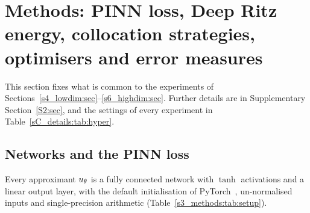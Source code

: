 \section[Methods]{Methods: PINN loss, Deep Ritz energy, collocation strategies, optimisers
and error measures}
\label{s3_methods:sec}

This section fixes what is common to the experiments of
Sections~\ref{s4_lowdim:sec}--\ref{s6_highdim:sec}. Further details are in Supplementary
Section~\ref{S2:sec}, and the settings of every experiment in
Table~\ref{sC_details:tab:hyper}.

\subsection{Networks and the PINN loss}\label{s3_methods:sec:pinn}

Every approximant $u_{\theta}$ is a fully connected network with $\tanh$ activations and a
linear output layer, with the default initialisation of PyTorch~\citep{paszke2019},
un-normalised inputs and single-precision arithmetic (Table~\ref{s3_methods:tab:setup}).

